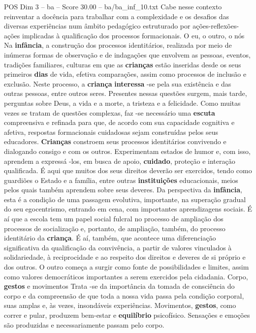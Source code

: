 \begin{textsample}{POS Dim 3 – ba – Score 30.00 – ba/ba\_inf\_10.txt}
Cabe nesse contexto reinventar a docência para trabalhar com a complexidade e os desafios das diversas experiências num âmbito pedagógico estruturado por ações-reflexões-ações implicadas à qualificação dos processos formacionais.
O eu, o outro, o nós Na \textbf{infância}, a construção dos processos identitários, realizada por meio de inúmeras formas de observação e de indagações que envolvem as pessoas, eventos, tradições familiares, culturas em que as \textbf{crianças} estão inseridas desde os seus primeiros \textbf{dias} de vida, efetiva comparações, assim como processos de inclusão e exclusão.
Neste processo, a \textbf{criança} \textbf{interessa} -se pela sua existência e das outras pessoas, entre outros seres.
Presentes nessas questões surgem, mais tarde, perguntas sobre Deus, a vida e a morte, a tristeza e a felicidade.
Como muitas vezes se tratam de questões complexas, faz -se necessário uma \textbf{escuta} compreensiva e refinada para que, de acordo com sua capacidade cognitiva e afetiva, respostas formacionais cuidadosas sejam construídas pelos seus educadores. \textbf{Crianças} constroem seus processos identitários convivendo e dialogando consigo e com os outros.
Experimentam estados de humor e, com isso, aprendem a expressá -los, em busca de apoio, \textbf{cuidado}, proteção e interação qualificada.
É aqui que muitos dos seus direitos deverão ser exercidos, tendo como guardiões o Estado e a família, entre outras \textbf{instituições} educacionais, meios pelos quais também aprendem sobre seus deveres.
Da perspectiva da \textbf{infância}, esta é a condição de uma passagem evolutiva, importante, na superação gradual do seu egocentrismo, entrando em cena, com importantes aprendizagens sociais.
É aí que a escola tem um papel social fulcral no processo de ampliação dos processos de socialização e, portanto, de ampliação, também, do processo identitário da \textbf{criança}.
É aí, também, que acontece uma diferenciação significativa da qualificação da convivência, a partir de valores vinculados à solidariedade, à reciprocidade e ao respeito dos direitos e deveres de si próprio e dos outros.
O outro começa a surgir como fonte de possibilidades e limites, assim como valores democráticos importantes a serem exercidos pela cidadania.
Corpo, \textbf{gestos} e movimentos Trata -se da importância da tomada de consciência do corpo e da compreensão de que toda a nossa vida passa pela condição corporal, suas amplas e, às vezes, insondáveis experiências.
Movimentos, \textbf{gestos}, como correr e pular, produzem bem-estar e \textbf{equilíbrio} psicofísico.
Sensações e emoções são produzidas e necessariamente passam pelo corpo.

\end{textsample}
